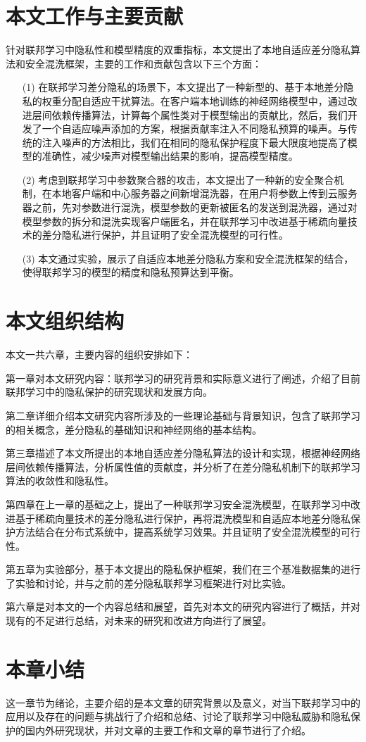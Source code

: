 \section{本文工作与主要贡献}
针对联邦学习中隐私性和模型精度的双重指标，本文提出了本地自适应差分隐私算法和安全混洗框架，主要的工作和贡献包含以下三个方面：
\begin{enumerate}
\item [(1)] 在联邦学习差分隐私的场景下，本文提出了一种新型的、基于本地差分隐私的权重分配自适应干扰算法。在客户端本地训练的神经网络模型中，通过改进层间依赖传播算法，计算每个属性类对于模型输出的贡献比，然后，我们开发了一个自适应噪声添加的方案，根据贡献率注入不同隐私预算的噪声。与传统的注入噪声的方法相比，我们在相同的隐私保护程度下最大限度地提高了模型的准确性，减少噪声对模型输出结果的影响，提高模型精度。
\item [(2)] 考虑到联邦学习中参数聚合器的攻击，本文提出了一种新的安全聚合机制，在本地客户端和中心服务器之间新增混洗器，在用户将参数上传到云服务器之前，先对参数进行混洗，模型参数的更新被匿名的发送到混洗器，通过对模型参数的拆分和混洗实现客户端匿名，并在联邦学习中改进基于稀疏向量技术的差分隐私进行保护，并且证明了安全混洗模型的可行性。
\item [(3)] 本文通过实验，展示了自适应本地差分隐私方案和安全混洗框架的结合，使得联邦学习的模型的精度和隐私预算达到平衡。
\end{enumerate}

\section{本文组织结构}

本文一共六章，主要内容的组织安排如下：

第一章对本文研究内容：联邦学习的研究背景和实际意义进行了阐述，介绍了目前联邦学习中的隐私保护的研究现状和发展方向。

第二章详细介绍本文研究内容所涉及的一些理论基础与背景知识，包含了联邦学习的相关概念，差分隐私的基础知识和神经网络的基本结构。

第三章描述了本文所提出的本地自适应差分隐私算法的设计和实现，根据神经网络层间依赖传播算法，分析属性值的贡献度，并分析了在差分隐私机制下的联邦学习算法的收敛性和隐私性。
  
第四章在上一章的基础之上，提出了一种联邦学习安全混洗模型，在联邦学习中改进基于稀疏向量技术的差分隐私进行保护，再将混洗模型和自适应本地差分隐私保护方法结合在分布式系统中，提高系统学习效果。并且证明了安全混洗模型的可行性。
    
第五章为实验部分，基于本文提出的隐私保护框架，我们在三个基准数据集的进行了实验和讨论，并与之前的差分隐私联邦学习框架进行对比实验。

第六章是对本文的一个内容总结和展望，首先对本文的研究内容进行了概括，并对现有的不足进行总结，对未来的研究和改进方向进行了展望。

\section{本章小结}
这一章节为绪论，主要介绍的是本文章的研究背景以及意义，对当下联邦学习中的应用以及存在的问题与挑战行了介绍和总结、讨论了联邦学习中隐私威胁和隐私保护的国内外研究现状，并对文章的主要工作和文章的章节进行了介绍。

